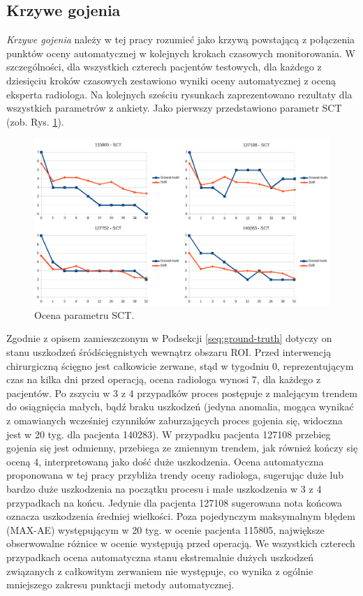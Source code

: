 \subsection{Krzywe gojenia}
 \textit{Krzywe gojenia} należy w tej pracy rozumieć jako krzywą powstającą z połączenia punktów oceny automatycznej w kolejnych krokach czasowych monitorowania. W szczególności, dla wszystkich czterech pacjentów testowych, dla każdego z dziesięciu kroków czasowych zestawiono wyniki oceny automatycznej z oceną eksperta radiologa. Na kolejnych sześciu rysunkach zaprezentowano rezultaty dla wszystkich parametrów z ankiety. Jako pierwszy przedstawiono parametr SCT (zob. Rys. \ref{fig:SCT}).
\begin{figure}[h!]
	\centering
	\includegraphics[width=1\textwidth]{figures/SCT.png}
	\caption{Ocena parametru SCT.}\label{fig:SCT}
\end{figure}
Zgodnie z opisem zamieszczonym w Podsekcji \ref{seq:ground-truth} dotyczy on stanu uszkodzeń śródścięgnistych wewnątrz obszaru ROI. Przed interwencją chirurgiczną ścięgno jest całkowicie zerwane, stąd w tygodniu 0, reprezentującym czas na kilka dni przed operacją, ocena radiologa wynosi 7, dla każdego z pacjentów. Po zszyciu w 3 z 4 przypadków proces postępuje z malejącym trendem do osiągnięcia małych, bądź braku uszkodzeń (jedyna anomalia, mogąca wynikać z omawianych wcześniej czynników zaburzających proces gojenia się, widoczna jest w 20 tyg. dla pacjenta 140283). W przypadku pacjenta 127108 przebieg gojenia się jest odmienny, przebiega ze zmiennym trendem, jak również kończy się oceną 4, interpretowaną jako dość duże uszkodzenia. Ocena automatyczna proponowana w tej pracy przybliża trendy oceny radiologa, sugerując duże lub bardzo duże uszkodzenia na początku procesu i małe uszkodzenia w 3 z 4 przypadkach na końcu. Jedynie dla pacjenta 127108 sugerowana nota końcowa oznacza uszkodzenia średniej wielkości. Poza pojedynczym maksymalnym błędem (MAX-AE) występującym w 20 tyg. w ocenie pacjenta 115805, największe obserwowalne różnice w ocenie występują przed operacją. We wszystkich czterech przypadkach ocena automatyczna stanu ekstremalnie dużych uszkodzeń związanych z całkowitym zerwaniem nie występuje, co wynika z ogólnie mniejszego zakresu punktacji metody automatycznej. 

